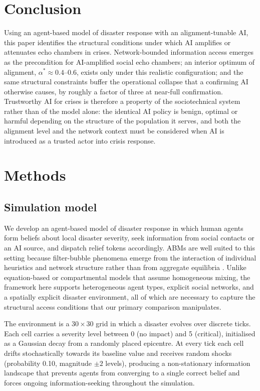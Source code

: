\documentclass[sn-apacite]{sn-jnl}
\begin{document}
\section{Conclusion}\label{sec:conclusion}

Using an agent-based model of disaster response with an alignment-tunable AI, this paper identifies the structural conditions under which AI amplifies or attenuates echo chambers in crises. Network-bounded information access emerges as the precondition for AI-amplified social echo chambers; an interior optimum of alignment, $\alpha^{*} \approx 0.4$--$0.6$, exists only under this realistic configuration; and the same structural constraints buffer the operational collapse that a confirming AI otherwise causes, by roughly a factor of three at near-full confirmation. Trustworthy AI for crises is therefore a property of the sociotechnical system rather than of the model alone: the identical AI policy is benign, optimal or harmful depending on the structure of the population it serves, and both the alignment level and the network context must be considered when AI is introduced as a trusted actor into crisis response.

\section{Methods}\label{sec:methods}

\subsection{Simulation model}\label{sec:model}

We develop an agent-based model of disaster response in which human agents form beliefs about local disaster severity, seek information from social contacts or an AI source, and dispatch relief tokens accordingly. ABMs are well suited to this setting because filter-bubble phenomena emerge from the interaction of individual heuristics and network structure rather than from aggregate equilibria \citep{epstein2006generative,axelrod1997complexity}. %
Unlike equation-based or compartmental models that assume homogeneous mixing, the framework here supports heterogeneous agent types, explicit social networks, and a spatially explicit disaster environment, all of which are necessary to capture the structural access conditions that our primary comparison manipulates.

The environment is a $30 \times 30$ grid in which a disaster evolves over discrete ticks. Each cell carries a severity level between 0 (no impact) and 5 (critical), initialised as a Gaussian decay from a randomly placed epicentre. At every tick each cell drifts stochastically towards its baseline value and receives random shocks (probability 0.10, magnitude $\pm 2$ levels), producing a non-stationary information landscape that prevents agents from converging to a single correct belief and forces ongoing information-seeking throughout the simulation.
\end{document}

